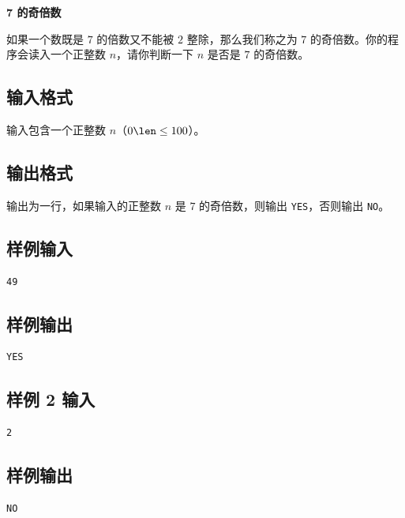 \documentclass{article}
\newcommand{\problemname}[1]{\begin{center}\Large\bfseries #1\end{center}}
\begin{document}
\problemname{7 的奇倍数}

如果一个数既是 $7$ 的倍数又不能被 $2$ 整除，那么我们称之为 $7$ 的奇倍数。你的程序会读入一个正整数 $n$，请你判断一下 $n$ 是否是 $7$ 的奇倍数。

\subsection*{输入格式}
输入包含一个正整数 $n$（$0\len\le100$）。

\subsection*{输出格式}
输出为一行，如果输入的正整数 $n$ 是 $7$ 的奇倍数，则输出 \texttt{YES}，否则输出 \texttt{NO}。

\subsection*{样例输入}
\begin{verbatim}
49
\end{verbatim}

\subsection*{样例输出}
\begin{verbatim}
YES
\end{verbatim}

\subsection*{样例 2 输入}
\begin{verbatim}
2
\end{verbatim}

\subsection*{样例输出}
\begin{verbatim}
NO
\end{verbatim}
\end{document}
